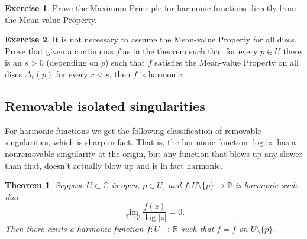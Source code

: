 \documentclass[12pt,openany]{book}
\newcommand{\sabs}[1]{\lvert {#1} \rvert}
\newcommand{\C}{{\mathbb{C}}}
\newcommand{\R}{{\mathbb{R}}}
\theoremstyle{plain}
\newtheorem{thm}{Theorem}[section]
\theoremstyle{remark}
\theoremstyle{definition}
\newenvironment{exbox}{%
    \def\FrameCommand{\vrule width 1pt \relax\hspace {10pt}}%
    \MakeFramed {\advance \hsize -\width \FrameRestore }%
}{%
    \endMakeFramed
}
\theoremstyle{exercise}
\newtheorem{exercise}{Exercise}[section]
\theoremstyle{example}
\begin{document}
\begin{exbox}
\begin{exercise}
Prove the Maximum Principle for harmonic functions directly from the
Mean-value Property.
\end{exercise}

\begin{exercise}
It is not necessary to assume the Mean-value Property for all discs.  Prove
that given a continuous $f$ as in the theorem such that for every $p \in U$
there is an $s > 0$ (depending on $p$) such that $f$ satisfies the Mean-value
Property on all discs $\Delta_r(p)$ for every $r < s$, then $f$ is
harmonic.
\end{exercise}
\end{exbox}

%

\subsection{Removable isolated singularities}

For harmonic functions we get the following classification of removable
singularities, which is sharp in fact.  That is, the harmonic function $\log
\sabs{z}$ has a nonremovable singularity at the origin, but any function
that blows up any slower than that, doesn't actually blow up and is in fact
harmonic.

\begin{thm}
Suppose $U \subset \C$ is open, $p \in U$, and $f \colon U \setminus \{ p \}
\to \R$ is harmonic such that
\begin{equation*}
\lim_{z\to p} \frac{f(z)}{\log \sabs{z}} = 0 .
\end{equation*}
Then there exists a harmonic function $\tilde{f} \colon U \to \R$ such that
$f = \tilde{f}$ on $U \setminus \{ p \}$.
\end{thm}
\end{document}
